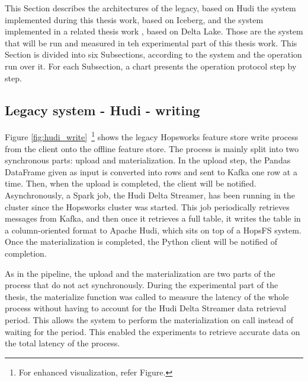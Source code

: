 This Section describes the architectures of the legacy, based on Hudi the system implemented during this thesis work, based on Iceberg, and the system implemented in a related thesis work \cite{manfrediReducingReadWrite2024}, based on Delta Lake. Those are the system that will be run and measured in teh experimental part of this thesis work. This Section is divided into six Subsections, according to the system and the operation run over it. For each Subsection, a chart presents the operation protocol step by step.



\subsection{Legacy system - Hudi - writing}
\label{subsec:back_sys_hudi_write}

Figure \ref{fig:hudi_write}~\footnote{For enhanced visualization, refer Figure.} shows the legacy Hopsworks feature store write process from the client onto the offline feature store.  The process is mainly split into two synchronous parts: upload and materialization. In the upload step, the Pandas DataFrame given as input is converted into rows and sent to Kafka one row at a time. Then, when the upload is completed, the client will be notified. Asynchronously, a Spark job, the Hudi Delta Streamer, has been running in the cluster since the Hopsworks cluster was started. This job periodically retrieves messages from Kafka, and then once it retrieves a full table, it writes the table in a column-oriented format to Apache Hudi, which sits on top of a \gls{HopsFS} system. Once the materialization is completed, the Python client will be notified of completion.

As in the pipeline, the upload and the materialization are two parts of the process that do not act synchronously. During the experimental part of the thesis, the materialize function was called to measure the latency of the whole process without having to account for the Hudi Delta Streamer data retrieval period. This allows the system to perform the materialization on call instead of waiting for the period. This enabled the experiments to retrieve accurate data on the total latency of the process.

